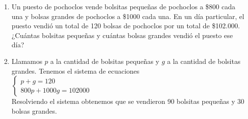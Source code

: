 \documentclass[a4paper]{article}
\newcommand{\answer}{\item[**]}
\begin{document}
\begin{enumerate}
\begin{enumerate} [label=(\alph*)]
		\item Un puesto de pochoclos vende bolsitas pequeñas de pochoclos a \$800 cada una y bolsas grandes de pochoclos a \$1000 cada una. En un día particular, el puesto vendió un total de 120 bolsas de pochoclos por un total de \$102.000. ¿Cuántas bolsitas pequeñas y cuántas bolsas grandes vendió el puesto ese día?
		\answer Llamamos $p$ a la cantidad de bolsitas pequeñas y $g$ a la cantidad de bolsitas grandes. Tenemos el sistema de ecuaciones \\ \vspace{2mm} $\left\{\begin{matrix} p+g=120 \\ 800p+1000g=102000 \end{matrix}\right.$ \\ Resolviendo el sistema obtenemos que se vendieron 90 bolsitas pequeñas y 30 bolsas grandes.


\end{enumerate}
\end{enumerate}
\end{document}
